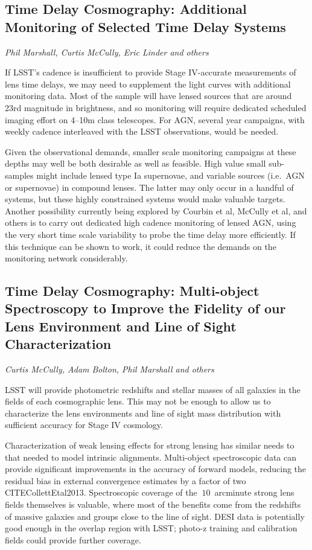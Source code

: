 \begin{enumerate}

\subsection{Time Delay Cosmography: Additional Monitoring of Selected Time Delay Systems}
{\it Phil Marshall, Curtis McCully, Eric Linder and others}

If LSST's cadence is insufficient to provide Stage IV-accurate
measurements of lens time delays, we may need to supplement the light
curves with additional monitoring data. Most of the sample will have
lensed sources that are around 23rd magnitude in brightness, and so
monitoring will require dedicated scheduled imaging effort on 4--10m
class telescopes. For AGN, several year campaigns, with
weekly cadence interleaved with the LSST observations, would be needed.

Given the observational demands,
smaller scale monitoring campaigns at these depths may well be
both desirable as well as feasible. High value small sub-samples might include
lensed type Ia supernovae, and variable sources (i.e.\ AGN or
supernovae) in compound lenses.
The latter may only occur in a handful of systems, but
these highly constrained systems would make valuable targets. Another
possibility currently being explored by Courbin et al, McCully et al,
and others is to carry out dedicated high cadence monitoring of lensed
AGN, using the very short time scale variability to probe the time delay
more efficiently. If this technique can be shown to work, it could
reduce the demands on the monitoring network considerably.


\subsection{Time Delay Cosmography: Multi-object Spectroscopy to Improve the Fidelity of our Lens Environment and Line of Sight Characterization}
{\it Curtis McCully, Adam Bolton, Phil Marshall and others}

LSST will provide photometric redshifts and stellar masses of all
galaxies in the fields of each cosmographic lens. This may not be enough
to allow us to characterize the lens environments and line of sight mass
distribution with sufficient accuracy for Stage IV cosmology.

Characterization of weak lensing effects for strong lensing has
similar needs to that needed to model intrinsic alignments. Multi-object
spectroscopic data can provide significant improvements in
the accuracy of forward models, reducing the residual 
bias in external convergence estimates
by a factor of two CITE{CollettEtal2013}.
Spectroscopic coverage of the $~10$~arcminute strong lens fields
themselves is valuable, where most of the benefits come from the redshifts of
massive galaxies and groups close to the line of sight. DESI data is
potentially good enough in the overlap region with LSST;
photo-z training and calibration fields could provide further coverage.



\end{enumerate}
